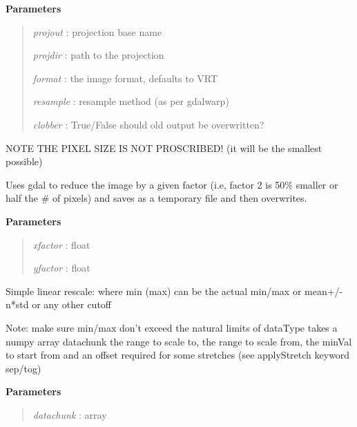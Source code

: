 \documentclass[letterpaper,10pt,english]{sphinxmanual}
\begin{document}
\begin{fulllineitems}
\begin{fulllineitems}
\textbf{Parameters}
\begin{quote}

\emph{projout}  : projection base name

\emph{projdir}  : path to the projection

\emph{format}   : the image format, defaults to VRT

\emph{resample} : resample method (as per gdalwarp)

\emph{clobber}  : True/False should old output be overwritten?
\end{quote}

NOTE THE PIXEL SIZE IS NOT PROSCRIBED! (it will be the smallest possible)

\end{fulllineitems}


\begin{fulllineitems}
\label{code:Image.Image.reduceImg}
Uses gdal to reduce the image by a given factor (i.e, factor 2 is 50\%
smaller or half the \# of pixels) and saves as a temporary file and then overwrites.

\textbf{Parameters}
\begin{quote}

\emph{xfactor} : float

\emph{yfactor} : float
\end{quote}

\end{fulllineitems}


\begin{fulllineitems}
\label{code:Image.Image.stretchLinear}
Simple linear rescale: where min (max) can be the actual min/max or mean+/- n*std or any other cutoff

Note: make sure min/max don't exceed the natural limits of dataType
takes a numpy array datachunk the range to scale to, the range to scale
from, the minVal to start from and an offset required for some stretches
(see applyStretch keyword sep/tog)

\textbf{Parameters}
\begin{quote}

\emph{datachunk}   : array


\end{quote}
\end{fulllineitems}
\end{fulllineitems}
\end{document}
